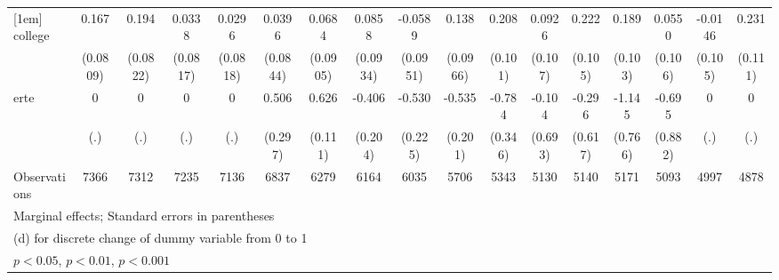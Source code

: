 {\begin{tabular}{l*{16}{c}}
[1em]
college             &       0.167\sym{*}  &       0.194\sym{*}  &      0.0338         &      0.0296         &      0.0396         &      0.0684         &      0.0858         &     -0.0589         &       0.138         &       0.208\sym{*}  &      0.0926         &       0.222\sym{*}  &       0.189         &      0.0550         &     -0.0146         &       0.231\sym{*}  \\
                    &    (0.0809)         &    (0.0822)         &    (0.0817)         &    (0.0818)         &    (0.0844)         &    (0.0905)         &    (0.0934)         &    (0.0951)         &    (0.0966)         &     (0.101)         &     (0.107)         &     (0.105)         &     (0.103)         &     (0.106)         &     (0.105)         &     (0.111)         \\
[1em]
erte                &           0         &           0         &           0         &           0         &       0.506         &       0.626\sym{***}&      -0.406\sym{*}  &      -0.530\sym{*}  &      -0.535\sym{**} &      -0.784\sym{*}  &      -0.104         &      -0.296         &      -1.145         &      -0.695         &           0         &           0         \\
                    &         (.)         &         (.)         &         (.)         &         (.)         &     (0.297)         &     (0.111)         &     (0.204)         &     (0.225)         &     (0.201)         &     (0.346)         &     (0.693)         &     (0.617)         &     (0.766)         &     (0.882)         &         (.)         &         (.)         \\
\hline
Observations        &        7366         &        7312         &        7235         &        7136         &        6837         &        6279         &        6164         &        6035         &        5706         &        5343         &        5130         &        5140         &        5171         &        5093         &        4997         &        4878         \\
\hline\hline
\multicolumn{17}{l}{\footnotesize Marginal effects; Standard errors in parentheses}\\
\multicolumn{17}{l}{\footnotesize  (d) for discrete change of dummy variable from 0 to 1}\\
\multicolumn{17}{l}{\footnotesize \sym{*} \(p<0.05\), \sym{**} \(p<0.01\), \sym{***} \(p<0.001\)}\\
\end{tabular}
}
